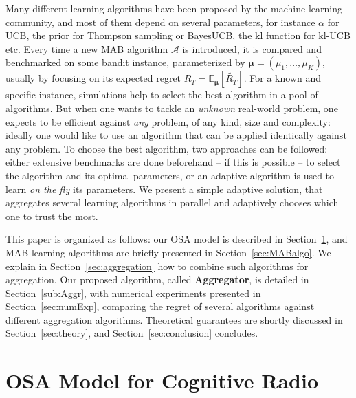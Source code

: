 \documentclass[conference]{IEEEtran}
\theoremstyle{plain}  %
\newcommand{\E}[0]{\mathbb{E}}
\newcommand{\UCB}[0]{$\mathrm{UCB}$}
\newcommand{\kl}[0]{\ensuremath{\mathrm{kl}}}
\newcommand{\klUCB}[0]{$\mathrm{kl}$-$\mathrm{UCB}$}
\newcommand{\Aggr}[0]{\textbf{Aggregator}}
\newcommand{\Alg}[0]{\mathcal{A}}
\begin{document}
Many different learning algorithms have been proposed by the machine learning community,
and most of them depend on several parameters, for instance $\alpha$ for \UCB, the prior for Thompson sampling or BayesUCB,
the $\kl$ function for \klUCB{} etc.
Every time a new MAB algorithm $\Alg$ is introduced, it is compared and benchmarked on some bandit instance, parameterized by $\boldsymbol{\mu} = (\mu_1,\dots,\mu_K)$, usually by focusing on its expected regret $R_T = \E_{\boldsymbol{\mu}}[\widetilde{R_T}]$.
%
For a known and specific instance, simulations help to select the best algorithm in a pool of algorithms.
But when one wants to tackle an \emph{unknown} real-world problem, one expects to be efficient against \emph{any} problem, of any kind, size and complexity:
ideally one would like to use an algorithm that can be applied identically against any problem.
To choose the best algorithm, two approaches can be followed:
either extensive benchmarks are done beforehand -- if this is possible -- to select the algorithm and its optimal parameters, or an adaptive algorithm is used to learn \emph{on the fly} its parameters.
We present a simple adaptive solution, that aggregates several learning algorithms in parallel and adaptively chooses which one to trust the most.

%
This paper is organized as follows:
our OSA model is described in Section~\ref{sec:model},
and MAB learning algorithms
are briefly presented in Section~\ref{sec:MABalgo}.
We explain in Section~\ref{sec:aggregation} how to combine such algorithms for aggregation.
Our proposed algorithm, called \Aggr, is detailed in Section~\ref{sub:Aggr},
with numerical experiments presented
in Section~\ref{sec:numExp}, comparing the regret of several algorithms against different aggregation algorithms.
Theoretical guarantees are shortly discussed in Section~\ref{sec:theory}, and Section~\ref{sec:conclusion} concludes.


\section{OSA Model for Cognitive Radio}\label{sec:model}
\end{document}
